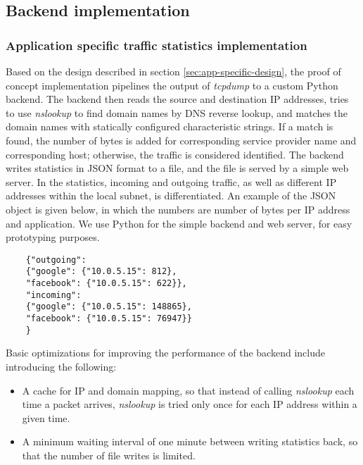 \subsection{Backend implementation}

\subsubsection{Application specific traffic statistics implementation}

Based on the design described in section \ref{sec:app-specific-design}, the proof of concept implementation pipelines the output of \textit{tcpdump} to a custom Python backend. The backend then reads the source and destination IP addresses, tries to use \textit{nslookup} to find domain names by DNS reverse lookup, and matches the domain names with statically configured characteristic strings. If a match is found, the number of bytes is added for corresponding service provider name and corresponding host; otherwise, the traffic is considered identified. The backend writes statistics in JSON format to a file, and the file is served by a simple web server. In the statistics, incoming and outgoing traffic, as well as different IP addresses within the local subnet, is differentiated. An example of the JSON object is given below, in which the numbers are number of bytes per IP address and application. We use Python for the simple backend and web server, for easy prototyping purposes.

\begin{listing}
	\begin{verbatim}
	{"outgoing": 
	{"google": {"10.0.5.15": 812}, 
	"facebook": {"10.0.5.15": 622}}, 
	"incoming": 
	{"google": {"10.0.5.15": 148865}, 
	"facebook": {"10.0.5.15": 76947}}
	}
	\end{verbatim}
\end{listing}

Basic optimizations for improving the performance of the backend include introducing the following:
\begin{itemize}
	
	\item A cache for IP and domain mapping, so that instead of calling \textit{nslookup} each time a packet arrives, \textit{nslookup} is tried only once for each IP address within a given time.
	
	\item A minimum waiting interval of one minute between writing statistics back, so that the number of file writes is limited.
	
\end{itemize}
